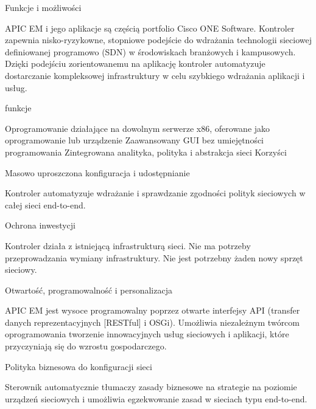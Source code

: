 \documentclass{article}
\begin{document}
Funkcje i możliwości

APIC EM i jego aplikacje są częścią portfolio Cisco ONE Software. Kontroler zapewnia nisko-ryzykowne, stopniowe podejście do wdrażania technologii sieciowej definiowanej programowo (SDN) w środowiskach branżowych i kampusowych. Dzięki podejściu zorientowanemu na aplikację kontroler automatyzuje dostarczanie kompleksowej infrastruktury w celu szybkiego wdrażania aplikacji i usług.

funkcje

Oprogramowanie działające na dowolnym serwerze x86, oferowane jako oprogramowanie lub urządzenie
Zaawansowany GUI bez umiejętności programowania
Zintegrowana analityka, polityka i abstrakcja sieci
Korzyści

Masowo uproszczona konfiguracja i udostępnianie

Kontroler automatyzuje wdrażanie i sprawdzanie zgodności polityk sieciowych w całej sieci end-to-end.

Ochrona inwestycji

Kontroler działa z istniejącą infrastrukturą sieci. Nie ma potrzeby przeprowadzania wymiany infrastruktury. Nie jest potrzebny żaden nowy sprzęt sieciowy.

Otwartość, programowalność i personalizacja

APIC EM jest wysoce programowalny poprzez otwarte interfejsy API (transfer danych reprezentacyjnych [RESTful] i OSGi). Umożliwia niezależnym twórcom oprogramowania tworzenie innowacyjnych usług sieciowych i aplikacji, które przyczyniają się do wzrostu gospodarczego.

Polityka biznesowa do konfiguracji sieci

Sterownik automatycznie tłumaczy zasady biznesowe na strategie na poziomie urządzeń sieciowych i umożliwia egzekwowanie zasad w sieciach typu end-to-end.
\end{document}

